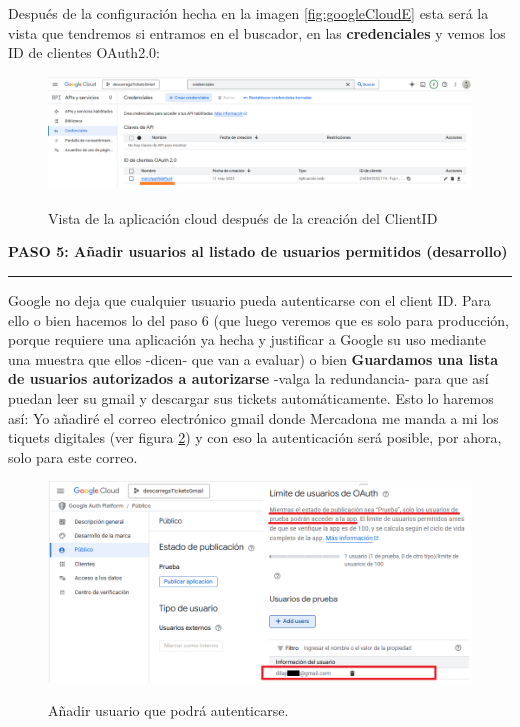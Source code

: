 \documentclass[a4paper,12pt]{report}
\begin{document}
	
	
	Después de la configuración hecha en la imagen \ref{fig:googleCloudE} esta será la vista que tendremos si entramos en el buscador, en las \textbf{credenciales} y vemos los ID de clientes OAuth2.0:
	
	\FloatBarrier
	\setlength{\belowcaptionskip}{3pt}
	\begin{figure}[H]
		\centering
		\caption{Vista de la aplicación cloud después de la creación del ClientID}
		\includegraphics[width=1\linewidth]{img/googleCloudF}
		\label{fig:googleCloudF}
	\end{figure}
	\FloatBarrier
	
	
	
	\noindent \textbf{PASO 5: Añadir usuarios al listado de usuarios permitidos (desarrollo)}
	\vspace{.1em}
	\hrule
	\vspace{.5em}
	
	Google no deja que cualquier usuario pueda autenticarse con el client ID. Para ello o bien hacemos lo del paso 6 (que luego veremos que es solo para producción, porque requiere una aplicación ya hecha y justificar a Google su uso mediante una muestra que ellos -dicen- que van a evaluar) o bien \textbf{Guardamos una lista de usuarios autorizados a autorizarse} -valga la redundancia- para que así puedan leer su gmail y descargar sus tickets automáticamente. Esto lo haremos así: Yo añadiré el correo electrónico gmail donde Mercadona me manda a mi los tiquets digitales (ver figura \ref{fig:googleCloudB}) y con eso la autenticación será posible, por ahora, solo para este correo.
	
	\FloatBarrier
	\setlength{\belowcaptionskip}{3pt}
	\begin{figure}[H]
		\centering
		\caption{Añadir usuario que podrá autenticarse.}
		\includegraphics[width=1\linewidth]{img/googleCloudB}
		\label{fig:googleCloudB}
	\end{figure}
	\FloatBarrier
	
\end{document}
